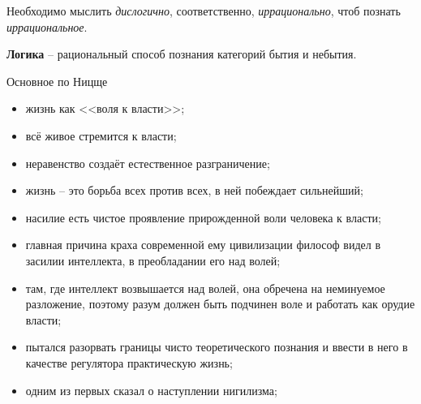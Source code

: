 Необходимо мыслить \emph{дислогично}, соответственно, \emph{иррационально}, чтоб познать 
\emph{иррациональное}. 

\textbf{Логика} -- рациональный способ познания категорий бытия и небытия.

Основное по Ницще
\begin{itemize}
    \itemsep-1ex
    \item жизнь как <<воля к власти>>;
    \item всё живое стремится к власти;
    \item неравенство создаёт естественное разграничение;
    \item жизнь -- это борьба всех против всех, в ней побеждает сильнейший;
    \item насилие есть чистое проявление прирожденной воли человека к власти;
    \item главная причина краха современной ему цивилизации философ видел в засилии интеллекта, в 
        преобладании его над волей;
    \item там, где интеллект возвышается над волей, она обречена на неминуемое разложение, поэтому разум 
        должен быть подчинен воле и работать как орудие власти;
    \item пытался разорвать границы чисто теоретического познания и ввести в него в качестве регулятора 
        практическую жизнь;
    \item одним из первых сказал о наступлении нигилизма;
\end{itemize}